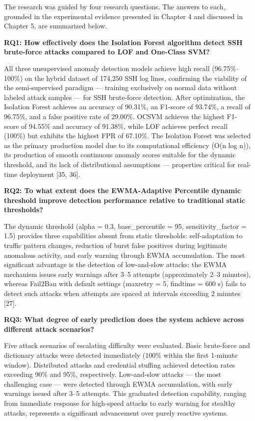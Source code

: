 \documentclass[
  a4paper]{report}
\begin{document}
The research was guided by four research questions. The answers to each,
grounded in the experimental evidence presented in Chapter 4 and
discussed in Chapter 5, are summarized below.

\textbf{RQ1: How effectively does the Isolation Forest algorithm detect
SSH brute-force attacks compared to LOF and One-Class SVM?}

All three unsupervised anomaly detection models achieve high recall
(96.75\%--100\%) on the hybrid dataset of 174,250 SSH log lines,
confirming the viability of the semi-supervised paradigm --- training
exclusively on normal data without labeled attack samples --- for SSH
brute-force detection. After optimization, the Isolation Forest achieves
an accuracy of 90.31\%, an F1-score of 93.74\%, a recall of 96.75\%, and
a false positive rate of 29.00\%. OCSVM achieves the highest F1-score of
94.55\% and accuracy of 91.38\%, while LOF achieves perfect recall
(100\%) but exhibits the highest FPR of 67.10\%. The Isolation Forest
was selected as the primary production model due to its computational
efficiency (O(n log n)), its production of smooth continuous anomaly
scores suitable for the dynamic threshold, and its lack of
distributional assumptions --- properties critical for real-time
deployment {[}35, 36{]}.

\textbf{RQ2: To what extent does the EWMA-Adaptive Percentile dynamic
threshold improve detection performance relative to traditional static
thresholds?}

The dynamic threshold (alpha = 0.3, base\_percentile = 95,
sensitivity\_factor = 1.5) provides three capabilities absent from
static thresholds: self-adaptation to traffic pattern changes, reduction
of burst false positives during legitimate anomalous activity, and early
warning through EWMA accumulation. The most significant advantage is the
detection of low-and-slow attacks: the EWMA mechanism issues early
warnings after 3--5 attempts (approximately 2--3 minutes), whereas
Fail2Ban with default settings (maxretry = 5, findtime = 600 s) fails to
detect such attacks when attempts are spaced at intervals exceeding 2
minutes {[}27{]}.

\textbf{RQ3: What degree of early prediction does the system achieve
across different attack scenarios?}

Five attack scenarios of escalating difficulty were evaluated. Basic
brute-force and dictionary attacks were detected immediately (100\%
within the first 1-minute window). Distributed attacks and credential
stuffing achieved detection rates exceeding 90\% and 95\%, respectively.
Low-and-slow attacks --- the most challenging case --- were detected
through EWMA accumulation, with early warnings issued after 3--5
attempts. This graduated detection capability, ranging from immediate
response for high-speed attacks to early warning for stealthy attacks,
represents a significant advancement over purely reactive systems.
\end{document}
